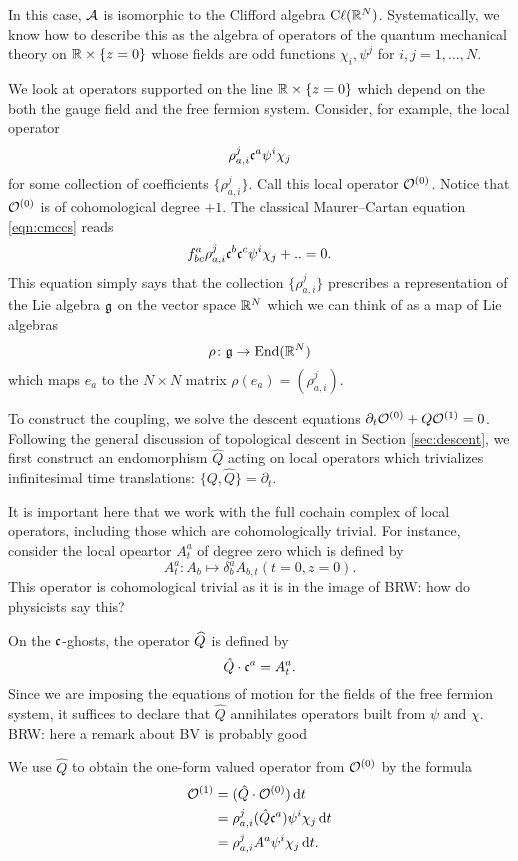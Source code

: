 \documentclass[11pt]{amsart}
\def\Cl{{\rm C}\ell}
\def\brian#1{{\textcolor{blue!65!red}{BRW: {#1}}}}
\begin{document}
In this case, $\cA$ is isomorphic to the Clifford algebra $\Cl(\RR^N)$. 
Systematically, we know how to describe this as the algebra of operators of the quantum mechanical theory on $\RR \times \{z=0\}$ whose fields are odd functions $\chi_i, \psi^j$ for $i,j=1,\ldots, N$. 

We look at operators supported on the line $\RR \times \{z=0\}$ which depend on the both the gauge field and the free fermion system.
Consider, for example, the local operator
\[
\rho_{a,i}^{j} \fc^a \psi^i \chi_j 
\]
for some collection of coefficients $\{\rho_{a,i}^{j}\}$. 
Call this local operator $\cO^{(0)}$. 
Notice that $\cO^{(0)}$ is of cohomological degree $+1$.
The classical Maurer--Cartan equation \eqref{eqn:cmccs} reads
\[
f_{bc}^a \rho_{a,i}^{j}  \fc^b \fc^c \psi^i \chi_j + .. = 0. 
\]
This equation simply says that the collection $\{\rho_{a,i}^{j} \}$ prescribes a representation of the Lie algebra $\fg$ on the vector space $\RR^N$ which we can think of as a map of Lie algebras 
\[
\rho \colon \fg \to \End(\RR^N)
\]
which maps $e_a$ to the $N \times N$ matrix $\rho(e_a) = (\rho_{a,i}^{j})$. 

To construct the coupling, we solve the descent equations $\partial_t \cO^{(0)} + Q \cO^{(1)} = 0$.
Following the general discussion of topological descent in Section \ref{sec:descent}, we first construct an endomorphism $\hat{Q}$ acting on local operators which trivializes infinitesimal time translations: $\{Q, \hat{Q}\} = \partial_t$. 

It is important here that we work with the full cochain complex of local operators, including those which are cohomologically trivial. 
For instance, consider the local opeartor $A^a_t$ of degree zero which is defined by
\[
A^a_{t} \colon A_b \mapsto \delta^a_b A_{b,t} (t=0, z=0) .
\]
This operator is cohomological trivial as it is in the image of \brian{how do physicists say this?}

On the $\fc$-ghosts, the operator $\Hat{Q}$ is defined by 
\[
\hat{Q} \cdot \fc^a = A^a_t  .
\]
Since we are imposing the equations of motion for the fields of the free fermion system, it suffices to declare that $\hat{Q}$ annihilates operators built from $\psi$ and $\chi$. 
\brian{here a remark about BV is probably good}

We use $\hat{Q}$ to obtain the one-form valued operator from $\cO^{(0)}$ by the formula
\begin{align*}
\cO^{(1)} & = (\hat{Q} \cdot \cO^{(0)}) \, \d t \\
& = \rho_{a,i}^j (\hat{Q} \fc^a) \psi^i \chi_j \, \d t \\ 
& = \rho_{a,i}^j A^a \psi^i \chi_j \, \d t .
\end{align*}
\end{document}
